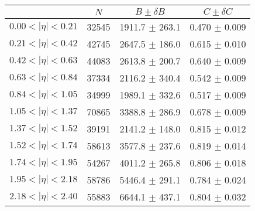 \begin{tabular}{lccc}
\hline
    &   $N$   & $B \pm \delta B$  &  $C \pm \delta C$ \\
\hline
$0.00 < |\eta| <0.21$          & 32545      & 1911.7     $\pm$ 263.1 & 0.470      $\pm$ 0.009 \\
$0.21 < |\eta| <0.42$          & 42745      & 2647.5     $\pm$ 186.0 & 0.615      $\pm$ 0.010 \\
$0.42 < |\eta| <0.63$          & 44083      & 2613.8     $\pm$ 200.7 & 0.640      $\pm$ 0.009 \\
$0.63 < |\eta| <0.84$          & 37334      & 2116.2     $\pm$ 340.4 & 0.542      $\pm$ 0.009 \\
$0.84 < |\eta| <1.05$          & 34999      & 1989.1     $\pm$ 332.6 & 0.517      $\pm$ 0.009 \\
$1.05 < |\eta| <1.37$          & 70865      & 3388.8     $\pm$ 286.9 & 0.678      $\pm$ 0.009 \\
$1.37 < |\eta| <1.52$          & 39191      & 2141.2     $\pm$ 148.0 & 0.815      $\pm$ 0.012 \\
$1.52 < |\eta| <1.74$          & 58613      & 3577.8     $\pm$ 237.6 & 0.819      $\pm$ 0.014 \\
$1.74 < |\eta| <1.95$          & 54267      & 4011.2     $\pm$ 265.8 & 0.806      $\pm$ 0.018 \\
$1.95 < |\eta| <2.18$          & 58786      & 5446.4     $\pm$ 291.1 & 0.784      $\pm$ 0.024 \\
$2.18 < |\eta| <2.40$          & 55883      & 6644.1     $\pm$ 437.1 & 0.804      $\pm$ 0.032 \\
\hline
\end{tabular}
